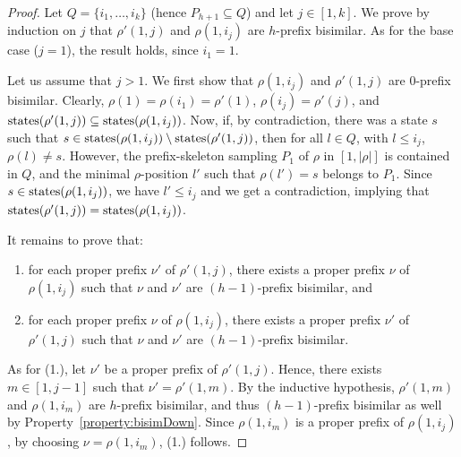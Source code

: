 \begin{proof}
Let $Q=\{i_1,\ldots,i_k\}$ (hence $P_{h+1}\subseteq Q$) and
let $j\in [1,k]$. We prove by induction on $j$ that  $\rho'(1,j)$ and $\rho(1,i_j)$ are $h$-prefix bisimilar. As for the base case ($j=1$), the result holds, since $i_1=1$.

Let us assume that $j>1$. We first show that $\rho(1,i_j)$ and $\rho'(1,j)$ are $0$-prefix bisimilar. Clearly, $\rho(1)=\rho(i_1)=\rho'(1)$, $\rho(i_j)=\rho'(j)$, and $\operatorname{states}(\rho'(1,j))\subseteq\operatorname{states}(\rho(1,i_j))$. Now, if, by contradiction, there was a state $s$ such that $s\in\operatorname{states}(\rho(1,i_j))\setminus \operatorname{states}(\rho'(1,j))$, then for all $l\in Q$, with $l\leq i_j$, $\rho(l)\neq s$. However, the prefix-skeleton sampling $P_1$ of $\rho$ in $[1,|\rho|]$ is contained in $Q$, and the minimal $\rho$-position $l'$ such that $\rho(l')=s$ belongs to $P_1$. Since $s\in\operatorname{states}(\rho(1,i_j))$, we have $l'\leq i_j$ and we get a contradiction, implying that $\operatorname{states}(\rho'(1,j)) = \operatorname{states}(\rho(1,i_j))$.

It remains to prove that:
\begin{enumerate}
  \item for each proper prefix $\nu'$ of $\rho'(1,j)$, there exists a proper prefix $\nu$ of $\rho(1,i_j)$  such that $\nu$ and $\nu'$ are $(h-1)$-prefix bisimilar, and
  \item for each proper prefix $\nu$ of $\rho(1,i_j)$, there exists a proper prefix  $\nu'$ of $\rho'(1,j)$ such that $\nu$ and $\nu'$ are $(h-1)$-prefix bisimilar.
\end{enumerate}

As for (1.), let $\nu'$ be a proper prefix of $\rho'(1,j)$. Hence, there exists $m\in [1,j-1]$ such that
$\nu'=\rho'(1,m)$. By the inductive hypothesis, $\rho'(1,m)$ and $\rho(1,i_m)$ are $h$-prefix bisimilar, and thus $(h-1)$-prefix bisimilar as well by Property~\ref{property:bisimDown}.
Since $\rho(1,i_m)$ is a proper prefix of $\rho(1,i_j)$, by choosing $\nu=\rho(1,i_m)$, (1.) follows.


\end{proof}
